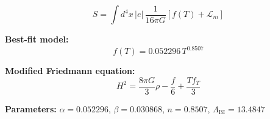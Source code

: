 
\begin{equation}
  S = \int d^4x \, |e| \, \frac{1}{16\pi G} \left[ f(T) + \mathcal{L}_m \right]
\end{equation}

\textbf{Best-fit model:}
\begin{equation}
  f(T) = 0.052296 \, T^{0.8507}
\end{equation}

\textbf{Modified Friedmann equation:}
\begin{equation}
  H^2 = \frac{8\pi G}{3} \rho - \frac{f}{6} + \frac{T f_T}{3}
\end{equation}

\textbf{Parameters:}
$\alpha = 0.052296$, \quad
$\beta = 0.030868$, \quad
$n = 0.8507$, \quad
$\Lambda_{\text{BI}} = 13.4847$
